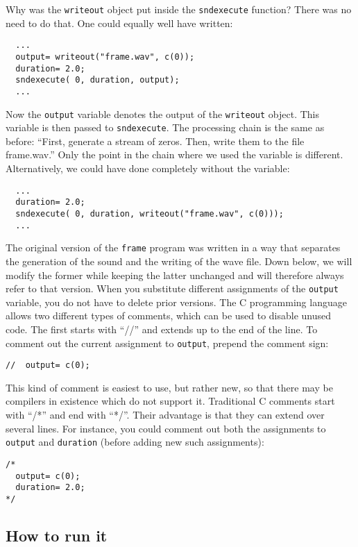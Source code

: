 \documentclass{article}
\def\bv{\begin{verbatim}}
\begin{document}
Why was the {\tt writeout} object put inside the {\tt sndexecute} function?
There was no need to do that.  One could equally well have written:

\bv
  ...
  output= writeout("frame.wav", c(0));
  duration= 2.0;
  sndexecute( 0, duration, output);
  ...
\end{verbatim}

Now the {\tt output} variable denotes the output of the {\tt writeout} object.
This variable is then passed to {\tt sndexecute}.  The processing chain is the
same as before:  ``First, generate a stream of zeros.  Then, write them to the
file frame.wav.''  Only the point in the chain where we used the variable is
different.  Alternatively, we could have done completely without the variable:

\bv
  ...
  duration= 2.0;
  sndexecute( 0, duration, writeout("frame.wav", c(0)));
  ...
\end{verbatim}

The original version of the {\tt frame} program was written in a way that
separates the generation of the sound and the writing of the wave file.  Down
below, we will modify the former while keeping the latter unchanged and will
therefore always refer to that version.  When you substitute different
assignments of the {\tt output} variable, you do not have to delete prior
versions.  The C programming language allows two different types of
comments, which can be used to disable unused code.  The first starts with
``//'' and extends up to the end of the line.  To comment out the current
assignment to {\tt output}, prepend the comment sign:

\bv
//  output= c(0);
\end{verbatim}

This kind of comment is easiest to use, but rather new, so that there may be
compilers in existence which do not support it.  Traditional C comments start
with ``/*'' and end with ``*/''.  Their advantage is that they can extend over
several lines.  For instance, you could comment out both the assignments to
{\tt output} and {\tt duration} (before adding new such assignments):

\bv
/*
  output= c(0);
  duration= 2.0;
*/
\end{verbatim}


\subsection{How to run it}
\end{document}
